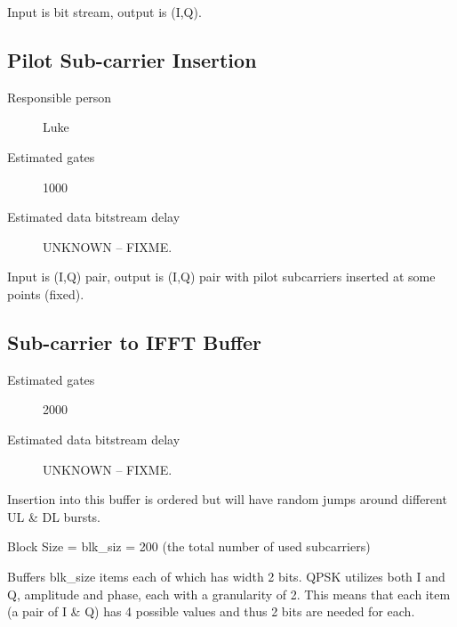 \documentclass[dvips,10pt,twocolumn]{article}
\begin{document}
Input is bit stream, output is (I,Q).




\subsection{Pilot Sub-carrier Insertion}
\label{sec:pilot}
\begin{description}
	\item[Responsible person] Luke
	\item[Estimated gates] 1000
	\item[Estimated data bitstream delay] UNKNOWN -- FIXME.
\end{description}

Input is (I,Q) pair, output is (I,Q) pair with pilot subcarriers
inserted at some points (fixed).




\subsection{Sub-carrier to IFFT Buffer}
\label{sec:ifft-buffer}
\begin{description}
	\item[Estimated gates] 2000
	\item[Estimated data bitstream delay] UNKNOWN -- FIXME.
\end{description}
Insertion into this buffer is ordered but will have random
jumps around different UL \& DL bursts.

Block Size = blk\_siz = 200 (the total number of used
subcarriers)

Buffers blk\_size items each of which has width 2 bits.
QPSK utilizes both I and Q, amplitude and phase, each with
a granularity of 2. This means that each item (a pair of I
\& Q) has 4 possible values and thus 2 bits are needed for
each.
\end{document}
